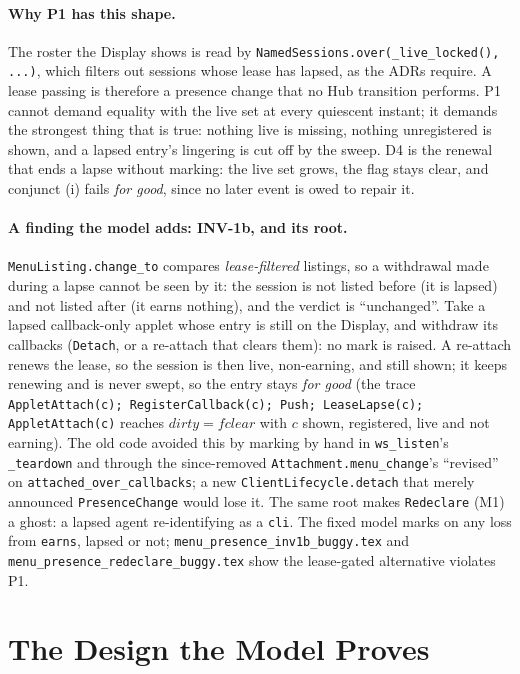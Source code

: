 \documentclass[a4paper,10pt,fleqn]{article}
\begin{document}
\paragraph{Why P1 has this shape.}
The roster the Display shows is read by
\texttt{NamedSessions.over(\_live\_locked(), ...)}, which filters out sessions
whose lease has lapsed, as the ADRs require. A lease passing is therefore a
presence change that no Hub transition performs. P1 cannot demand equality
with the live set at every quiescent instant; it demands the strongest thing
that is true: nothing live is missing, nothing unregistered is shown, and a
lapsed entry's lingering is cut off by the sweep. D4 is the renewal that ends
a lapse without marking: the live set grows, the flag stays clear, and conjunct
(i) fails \emph{for good}, since no later event is owed to repair it.

\paragraph{A finding the model adds: INV-1b, and its root.}
\texttt{MenuListing.change\_to} compares \emph{lease-filtered} listings, so a
withdrawal made during a lapse cannot be seen by it: the session is not listed
before (it is lapsed) and not listed after (it earns nothing), and the verdict
is ``unchanged''. Take a lapsed callback-only applet whose entry is still on the
Display, and withdraw its callbacks (\texttt{Detach}, or a re-attach that clears
them): no mark is raised. A re-attach renews the lease, so the session is then
live, non-earning, and still shown; it keeps renewing and is never swept, so the
entry stays \emph{for good} (the trace
\texttt{AppletAttach(c); RegisterCallback(c); Push; LeaseLapse(c); AppletAttach(c)}
reaches $dirty = fclear$ with $c$ shown, registered, live and not earning). The
old code avoided this by marking by hand in \texttt{ws\_listen}'s
\texttt{\_teardown} and through the since-removed \texttt{Attachment.menu\_change}'s
``revised'' on \texttt{attached\_over\_callbacks}; a new \texttt{ClientLifecycle.detach}
that merely announced \texttt{PresenceChange} would lose it. The same root
makes \texttt{Redeclare} (M1) a ghost: a lapsed agent re-identifying as a
\texttt{cli}. The fixed model marks on any loss from \texttt{earns}, lapsed or
not; \texttt{menu\_presence\_inv1b\_buggy.tex} and
\texttt{menu\_presence\_redeclare\_buggy.tex} show the lease-gated alternative
violates P1.

\section{The Design the Model Proves}
\label{sec:design}
\end{document}
